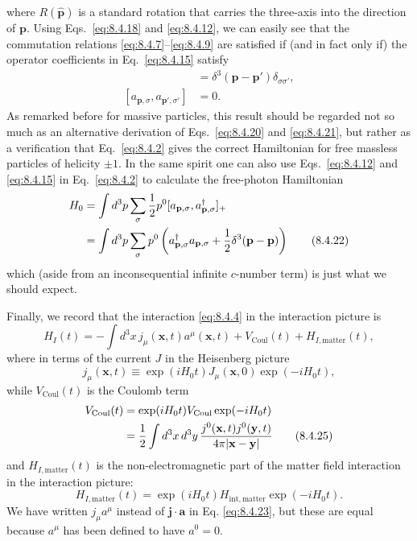 where $R(\widehat{\mathbf p})$ is a standard rotation that carries the
three-axis into the direction of $\mathbf p$. Using Eqs.~\eqref{eq:8.4.18} and
\eqref{eq:8.4.12}, we can easily see that the commutation relations
\eqref{eq:8.4.7}--\eqref{eq:8.4.9} are satisfied if (and in fact only if) the operator
coefficients in Eq.~\eqref{eq:8.4.15} satisfy
\begin{align}
[a_{\mathbf p,\sigma},a^\dagger_{\mathbf p',\sigma'}]
&=\delta^3(\mathbf p-\mathbf p')\delta_{\sigma\sigma'},
\tag{8.4.20}\label{eq:8.4.20}\\
[a_{\mathbf p,\sigma},a_{\mathbf p',\sigma'}]&=0.
\tag{8.4.21}\label{eq:8.4.21}
\end{align}
As remarked before for massive particles, this result should be regarded not
so much as an alternative derivation of Eqs.~\eqref{eq:8.4.20} and \eqref{eq:8.4.21}, but rather
as a verification that Eq.~\eqref{eq:8.4.2} gives the correct Hamiltonian for free
massless particles of helicity $\mathord\pm1$. In the same spirit one can also
use Eqs.~\eqref{eq:8.4.12} and \eqref{eq:8.4.15} in Eq.~\eqref{eq:8.4.2} to calculate the free-photon
Hamiltonian
\begin{align}
H_0
&=\int d^3p\sum_\sigma\frac12p^0
  [a_{\mathbf p,\sigma},a^\dagger_{\mathbf p,\sigma}]_+
\notag\\
&=\int d^3p\sum_\sigma p^0
  \left(a^\dagger_{\mathbf p,\sigma}a_{\mathbf p,\sigma}
  +\frac12\delta^3(\mathbf p-\mathbf p)\right)
\tag{8.4.22}\label{eq:8.4.22}
\end{align}
which (aside from an inconsequential infinite $c$-number term) is just what we
should expect.

Finally, we record that the interaction \eqref{eq:8.4.4} in the interaction picture is
\begin{equation}
H_I(t)=-\int d^3x\,j_\mu(\mathbf x,t)a^\mu(\mathbf x,t)
 +V_{\mathrm{Coul}}(t)+H_{I,\mathrm{matter}}(t),
\tag{8.4.23}\label{eq:8.4.23}
\end{equation}
where in terms of the current $J$ in the Heisenberg picture
\begin{equation}
j_\mu(\mathbf x,t)\equiv
\exp(iH_0t)J_\mu(\mathbf x,0)\exp(-iH_0t),
\tag{8.4.24}\label{eq:8.4.24}
\end{equation}
while $V_{\mathrm{Coul}}(t)$ is the Coulomb term
\begin{align}
V_{\mathrm{Coul}}(t)
&=\exp(iH_0t)V_{\mathrm{Coul}}\exp(-iH_0t)
\notag\\
&=\frac12\int d^3x\,d^3y\,
  \frac{j^0(\mathbf x,t)j^0(\mathbf y,t)}
       {4\pi\lvert\mathbf x-\mathbf y\rvert}
\tag{8.4.25}\label{eq:8.4.25}
\end{align}
and $H_{I,\mathrm{matter}}(t)$ is the non-electromagnetic part of the matter
field interaction in the interaction picture:
\begin{equation}
H_{I,\mathrm{matter}}(t)=
\exp(iH_0t)H_{\mathrm{int,matter}}\exp(-iH_0t).
\tag{8.4.26}\label{eq:8.4.26}
\end{equation}
We have written $j_\mu a^\mu$ instead of $\mathbf j\cdot\mathbf a$ in Eq.
\eqref{eq:8.4.23}, but these are equal because $a^\mu$ has been defined to have
$a^0=0$.
